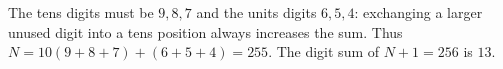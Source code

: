 The tens digits must be $9,8,7$ and the units digits $6,5,4$: exchanging a larger unused digit into a tens position always increases the sum. Thus $N=10(9+8+7)+(6+5+4)=255$. The digit sum of $N+1=256$ is $\boxed{13}$.
